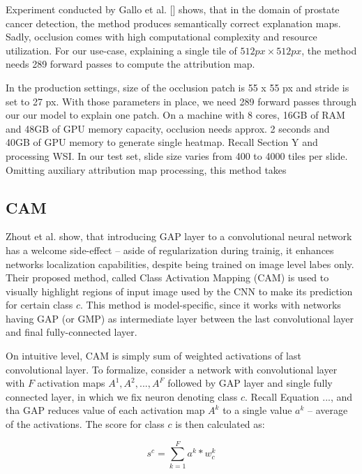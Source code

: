 Experiment conducted by Gallo et al. [] shows, that in the domain of prostate cancer detection, the method produces semantically correct explanation maps. Sadly, occlusion comes with high computational complexity and resource utilization. For our use-case, explaining a single tile of $512px \times 512px$, the method needs 289 forward passes to compute the attribution map. 

In the production settings, size of the occlusion patch is 55 x 55 px and stride is set to 27 px. With those parameters in place, we need 289 forward passes through our our model to explain one patch. On a machine with 8 cores, 16GB of RAM and 48GB of GPU memory capacity, occlusion needs approx. 2 seconds and 40GB of GPU memory to generate single heatmap. Recall Section Y and processing WSI. In our test set, slide size varies from 400 to 4000 tiles per slide. Omitting auxiliary attribution map processing, this method takes  


\subsection{CAM}

Zhout et al. show, that introducing GAP layer to a convolutional neural network has a welcome side-effect -- aside of regularization during trainig, it enhances networks localization capabilities, despite being trained on image level labes only. Their proposed method, called Class Activation Mapping (CAM) is used to visually highlight regions of input image used by the CNN to make its prediction for certain class $c$. This method is model-specific, since it works with networks having GAP (or GMP) as intermediate layer between the last convolutional layer and final fully-connected layer. 

On intuitive level, CAM is simply sum of weighted activations of last convolutional layer. To formalize, consider a network with convolutional layer with $F$ activation maps $A^1, A^2, ..., A^F$ followed by GAP layer and single fully connected layer, in which we fix neuron denoting class $c$. Recall Equation ..., and tha GAP reduces value of each activation map $A^k$ to a single value $a^k$ -- average of the activations. The score for class $c$ is then calculated as:

\begin{equation}
    s^c = \sum_{k=1}^F a^k * w^k_c
\end{equation}

